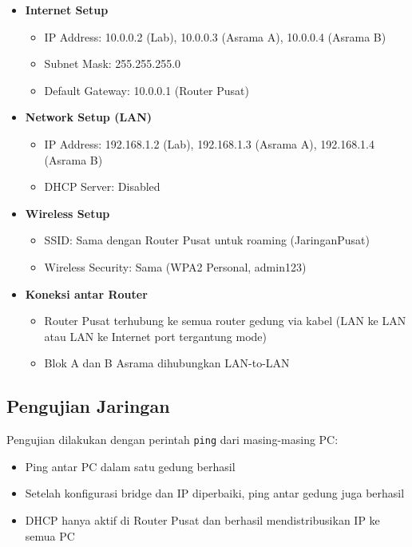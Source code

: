 \begin{itemize}
  \item \textbf{Internet Setup}
    \begin{itemize}
      \item IP Address: 10.0.0.2 (Lab), 10.0.0.3 (Asrama A), 10.0.0.4 (Asrama B)
      \item Subnet Mask: 255.255.255.0
      \item Default Gateway: 10.0.0.1 (Router Pusat)
    \end{itemize}
  
  \item \textbf{Network Setup (LAN)}
    \begin{itemize}
      \item IP Address: 192.168.1.2 (Lab), 192.168.1.3 (Asrama A), 192.168.1.4 (Asrama B)
      \item DHCP Server: Disabled
    \end{itemize}
    
  \item \textbf{Wireless Setup}
    \begin{itemize}
      \item SSID: Sama dengan Router Pusat untuk roaming (JaringanPusat)
      \item Wireless Security: Sama (WPA2 Personal, admin123)
    \end{itemize}
    
  \item \textbf{Koneksi antar Router}
    \begin{itemize}
      \item Router Pusat terhubung ke semua router gedung via kabel (LAN ke LAN atau LAN ke Internet port tergantung mode)
      \item Blok A dan B Asrama dihubungkan LAN-to-LAN
    \end{itemize}
\end{itemize}

\subsection{Pengujian Jaringan}

Pengujian dilakukan dengan perintah \texttt{ping} dari masing-masing PC:

\begin{itemize}
  \item Ping antar PC dalam satu gedung berhasil
  \item Setelah konfigurasi bridge dan IP diperbaiki, ping antar gedung juga berhasil
  \item DHCP hanya aktif di Router Pusat dan berhasil mendistribusikan IP ke semua PC
\end{itemize}

